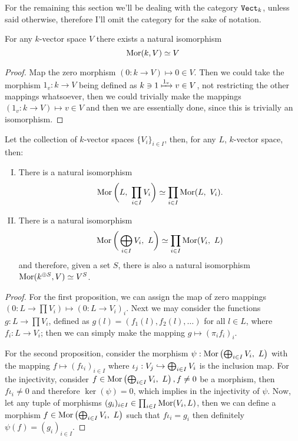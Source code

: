 \begin{remark}
For the remaining this section we'll be dealing with the category
\({\texttt{Vect}}_k\), unless said otherwise, therefore I'll omit the
category for the sake of notation.
\end{remark}

\begin{proposition}
  For any \(k\)-vector space \(V\) there exists a natural isomorphism
  \[
    \operatorname{Mor}(k, V) \simeq V
  \]
\end{proposition}

\begin{proof}
Map the zero morphism \((0 : k \to V) \longmapsto 0 \in V\). Then we could take
the morphism \(1_v : k \to V\) being defined as \(k \ni 1 \xmapsto{1_v} v \in
V\), not restricting the other mappings whatsoever, then we could trivially
make the mappings \((1_v : k \to V) \longmapsto v \in V\) and then we are
essentially done, since this is trivially an isomorphism.
\end{proof}

\begin{proposition}
Let the collection of \(k\)-vector spaces \(\{V_i\}_{i \in I}\), then, for any
\(L\), \(k\)-vector space, then:
\begin{enumerate}[I.]
  \item There is a natural isomorphism
    \[
      \operatorname{Mor} \bigg( L,\ \prod_{i \in I} V_i \bigg) \simeq \prod_{i \in
      I} \operatorname{Mor}(L,\ V_i).
    \]
  \item There is a natural isomorphism
    \[
      \operatorname{Mor}\bigg( \bigoplus_{i \in I} V_i,\ L \bigg) \simeq
      \prod_{i \in I} \operatorname{Mor}(V_i,\ L)
    \]
    and therefore, given a set \(S\), there is also a natural isomorphism
    \(\operatorname{Mor}(k^{\oplus S}, V) \simeq V^S\).
\end{enumerate}
\end{proposition}

\begin{proof}
For the first proposition, we can assign the map of zero mappings \((0 : L \to
\prod V_i) \longmapsto (0 : L \to V_i)_i\). Next we may consider the functions
\(g : L \to \prod V_i\), defined as \(g(l) = (f_1(l), f_2(l), \dots)\) for all
\(l \in L\), where \(f_i : L \to V_i\); then we can simply make the mapping
\(g \longmapsto (\pi_i  f_i)_i\).

For the second proposition, consider the morphism \(\psi : \operatorname{Mor}\left(
\bigoplus_{i \in I} V_i,\ L \right) \) with the mapping \(f \mapsto (f
\iota_i)_{i \in I}\) where \(\iota_j: V_j \hookrightarrow \bigoplus_{i \in
I} V_i\) is the inclusion map. For the injectivity, consider \(f \in
\operatorname{Mor}\left( \bigoplus_{i \in I} V_i,\ L \right), f \neq 0\) be a morphism,
then \(f  \iota_i \neq 0\) and therefore \(\ker(\psi) = 0\), which
implies in the injectivity of \(\psi\). Now, let any tuple of morphisms
\((g_i)_{i \in I} \in \prod_{i \in I} \operatorname{Mor}(V_i, L)\), then we can define a
morphism \(f \in \operatorname{Mor}\left( \bigoplus_{i \in I} V_i,\ L \right)\) such that
\(f  \iota_i = g_i\) then definitely \(\psi(f) = (g_i)_{i \in I}\).
\end{proof}

